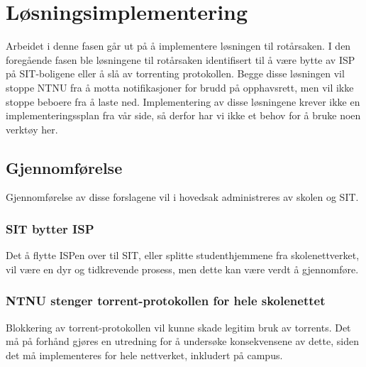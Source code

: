 \chapter{Løsningsimplementering}
Arbeidet i denne fasen går ut på å implementere løsningen til rotårsaken. I den foregående fasen ble løsningene til rotårsaken identifisert til å være bytte av ISP på SIT-boligene eller å slå av torrenting protokollen. Begge disse løsningen vil stoppe NTNU fra å motta notifikasjoner for brudd på opphavsrett, men vil ikke stoppe beboere fra å laste ned. Implementering av disse løsningene krever ikke en implementeringssplan fra vår side, så derfor har vi ikke et behov for å bruke noen verktøy her.

\section{Gjennomførelse}
Gjennomførelse av disse forslagene vil i hovedsak administreres av skolen og SIT.

\subsection{SIT bytter ISP}
Det å flytte ISPen over til SIT, eller splitte studenthjemmene fra skolenettverket, vil være en dyr og tidkrevende prosess, men dette kan være verdt å gjennomføre. 

\subsection{NTNU stenger torrent-protokollen for hele skolenettet}
Blokkering av torrent-protokollen vil kunne skade legitim bruk av torrents. Det må på forhånd gjøres en utredning for å undersøke konsekvensene av dette, siden det må implementeres for hele nettverket, inkludert på campus. 